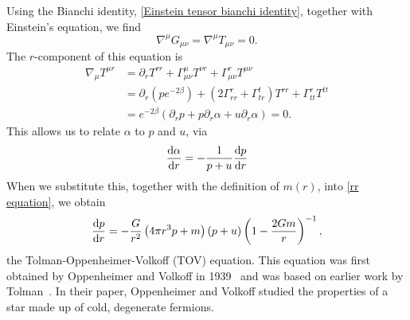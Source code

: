 Using the Bianchi identity, \autoref{Einstein tensor bianchi identity}, together with Einstein's equation, we find
%
\begin{equation}
    \nabla^\mu G_{\mu \nu} = \nabla^\mu T_{\mu \nu} = 0.
\end{equation}
%
The $r$-component of this equation is
%
\begin{align*}
    \nabla_\mu T^{\mu r} 
    & =
    \partial_r T^{rr} 
    + \Gamma^\mu_{\mu \nu} T^{\nu r} 
    + \Gamma^r_{\mu \nu} T^{\mu \nu}\\
    & = 
    \partial_r \left(p e^{-2\beta}\right)
    + (2 \Gamma^r_{rr} + \Gamma^t_{tr}) T^{rr} 
    + \Gamma^r_{tt}T^{tt} \\ 
    &=   e^{-2\beta} \left( \partial_r p + p \partial_r \alpha + u \partial_r \alpha \right) = 0.
\end{align*} 
%
This allows us to relate $\alpha$ to $p$ and $u$, via
%
\begin{equation}
    \label{alpha in terms of p and u}
    \odv{\alpha}{r}= - \frac{1}{p + u} \odv{p}{r}
\end{equation}
%
When we substitute this, together with the definition of $m(r)$, into \autoref{rr equation}, we obtain
%
\begin{equation}
    \label{TOV}
    \odv{p}{r}
    =
    -
    \frac{G}{r^2} 
    \left(4 \pi r^{3} p + m \right) 
    \left(p + u\right)
    \left(1 - \frac{2 G m}{r}\right)^{-1},
\end{equation}
%
the Tolman-Oppenheimer-Volkoff (TOV) equation.
This equation was first obtained by Oppenheimer and Volkoff in 1939~\autocite{oppenheimerMassiveNeutronCores1939} and was based on earlier work by Tolman~\autocite{tolmanRelativityThermodynamicsCosmology1934}.
In their paper, Oppenheimer and Volkoff studied the properties of a star made up of cold, degenerate fermions.



